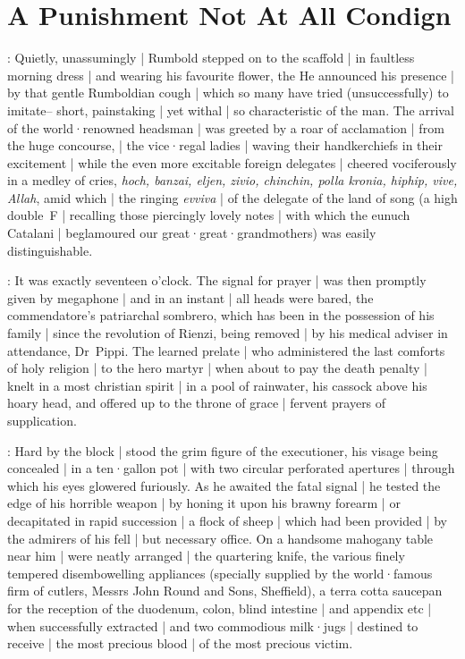 \section{A Punishment Not At All Condign}

:
Quietly, unassumingly |
Rumbold stepped on to the scaffold |
in faultless morning dress |
and wearing his favourite flower,
the 
He announced his presence |
by that gentle Rumboldian cough |
which so many have tried (unsuccessfully) to imitate--%
short,
painstaking |
yet withal |
so characteristic of the man.
The arrival of the world·renowned headsman |
was greeted by a roar of acclamation |
from the huge concourse, |
the vice·regal ladies |
waving their handkerchiefs in their excitement |
while the even more excitable foreign delegates |
cheered vociferously in a medley of cries,
\emph{hoch,
banzai,
eljen,
zivio,
chinchin,
polla kronia,
hiphip,
vive,
Allah},
amid which |
the ringing \emph{evviva} |
of the delegate of the land of song
(a high double~F |
recalling those piercingly lovely notes |
with which the eunuch Catalani |
beglamoured our great·great·grandmothers)
was easily distinguishable.

:
It was exactly seventeen o'clock.
The signal for prayer |
was then promptly given by megaphone |
and in an instant |
all heads were bared,
the commendatore's patriarchal sombrero,
which has been in the possession of his family |
since the revolution of Rienzi,
being removed |
by his medical adviser in attendance,
Dr~Pippi.
The learned prelate |
who administered the last comforts of holy religion |
to the hero martyr |
when about to pay the death penalty
 |
knelt in a most christian spirit |
in a pool of rainwater,
his cassock above his hoary head,
and offered up to the throne of grace |
fervent prayers of supplication.

:
Hard by the block |
stood the grim figure of the executioner,
his visage being concealed |
in a ten·gallon pot |
with two circular perforated apertures |
through which his eyes glowered furiously.
As he awaited the fatal signal |
he tested the edge of his horrible weapon |
by honing it upon his brawny forearm |
or decapitated in rapid succession |
a flock of sheep |
which had been provided |
by the admirers of his fell |
but necessary office.
On a handsome mahogany table near him |
were neatly arranged |
the quartering knife,
the various finely tempered disembowelling appliances
(specially supplied by the world·famous firm of cutlers,
Messrs John Round and Sons,
Sheffield),
a terra cotta saucepan for the reception of the duodenum,
colon,
blind intestine |
and appendix etc |
when successfully extracted |
and two commodious milk·jugs |
destined to receive |
the most precious blood |
of the most precious victim.

